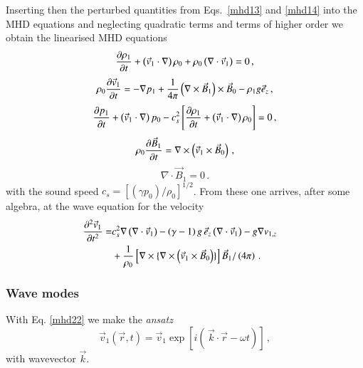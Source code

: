 Inserting then the perturbed quantities from Eqs.~\ref{mhd13} and \ref{mhd14} 
into the MHD equations and neglecting quadratic terms and terms of higher order we obtain the linearised MHD equations
\begin{equation}
{\partial\rho_1\over\partial t}+\left(\vec v_1\cdot\nabla\right)\rho_0+\rho_0\left(\nabla\cdot\vec v_1\right) = 0\,,
\label{mhd17}
\end{equation}
\begin{equation}
\rho_0{\partial\vec v_1\over\partial t} = -\nabla p_1 + {1\over4\pi}\left(\nabla\times\vec B_1\right)\times\vec B_0 - \rho_1g\vec e_z\,,
\label{mhd18}
\end{equation}
\begin{equation}
{\partial p_1\over\partial t}+\left(\vec v_1\cdot\nabla\right)p_0 -c_s^2\left[{\partial\rho_1\over\partial t}+\left(\vec v_1\cdot\nabla\right)\rho_0\right]=0\,,
\label{mhd19}
\end{equation}
\begin{equation}
\rho_0{\partial\vec B_1\over\partial t} = \nabla\times\left(\vec v_1\times\vec B_0\right)\,,
\label{mhd20}
\end{equation}
\begin{equation}
\nabla\cdot\vec B_1 = 0\,.
\label{mhd21}
\end{equation}
with the sound speed $c_s=[(\gamma p_0)/\rho_0]^{1/2}$. From these one arrives, after some algebra, at the wave equation for the velocity
\begin{eqnarray}
 \frac{\partial^2\vec v_1}{\partial t^2} = &c_s^2\nabla\left(\nabla\cdot\vec v_1\right)-\left(\gamma-1\right)g\, \vec e_z\left(\nabla\cdot\vec v_1\right) -g\nabla v_{1,z}\cr
&+{1\over\rho_0}\left[\nabla\times\{\nabla\times\left(\vec v_1\times\vec B_0\right)\}\right]\vec B_1/\left(4\pi\right)\,.
\label{mhd22}
\end{eqnarray}


\subsubsection*{Wave modes\label{wavemodes}}

With Eq. \ref{mhd22} we make the {\em ansatz} 
\begin{equation}
\vec v_1(\vec r,t)=\vec v_1\exp\left[i\left(\,\vec k\cdot\vec r-\omega t\right)\right]\,,
\label{mhd23}
\end{equation}
with wavevector $\vec k$.

